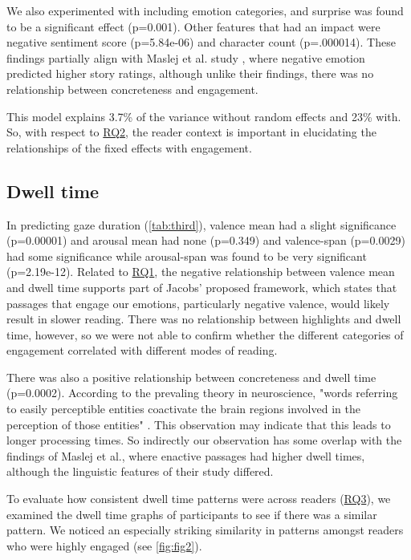 \documentclass[11pt]{article}
\begin{document}
We also experimented with including emotion categories, and surprise was found to be a significant effect (p=0.001). Other features that had an impact were negative sentiment score (p=5.84e-06) and character count (p=.000014). These findings partially align with Maslej et al. study \citep{Maslej2019TheTF}, where negative emotion predicted higher story ratings, although unlike their findings, there was no relationship between concreteness and engagement.

This model explains 3.7\% of the variance without random effects and 23\% with. So, with respect to \hyperref[subsection:rq2]{RQ2}, the reader context is important in elucidating the relationships of the fixed effects with engagement.

\subsection{Dwell time}
  
In predicting gaze duration (\autoref{tab:third}), valence mean had a slight significance (p=0.00001) and arousal mean had none (p=0.349) and valence-span (p=0.0029) had some significance while arousal-span was found to be very significant (p=2.19e-12). Related to \hyperref[subsection:rq1]{RQ1}, the negative relationship between valence mean and dwell time supports part of Jacobs' proposed framework, which states that passages that engage our emotions, particularly negative valence, would likely result in slower reading. There was no relationship between highlights and dwell time, however, so we were not able to confirm whether the different categories of engagement correlated with different modes of reading.

There was also a positive relationship between concreteness and dwell time (p=0.0002). According to the prevaling theory in neuroscience, "words referring to easily perceptible entities coactivate the brain regions involved in the perception of those entities" \citep{brysbaert2014}. This observation may indicate that this leads to longer processing times. So indirectly our observation has some overlap with the findings of Maslej et al., where enactive passages had higher dwell times, although the linguistic features of their study differed.

To evaluate how consistent dwell time patterns were across readers (\hyperref[subsection:rq3]{RQ3}), we examined the dwell time graphs of participants to see if there was a similar pattern. We noticed an especially striking similarity in patterns amongst readers who were highly engaged (see \autoref{fig:fig2}).
\end{document}
